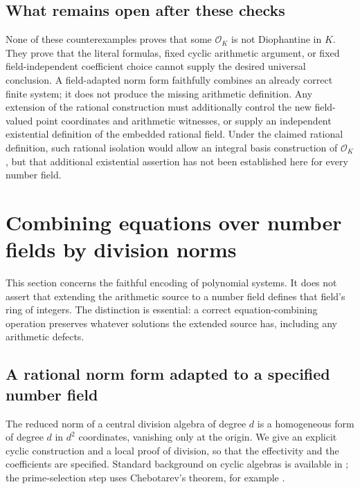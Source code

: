 \documentclass[11pt]{article}
\theoremstyle{definition}
\begin{document}
\subsection{What remains open after these checks}

None of these counterexamples proves that some
$\mathcal O_K$ is not Diophantine in $K$.  They prove that
the literal formulas, fixed cyclic arithmetic argument,
or fixed field-independent coefficient choice cannot supply
the desired universal conclusion.  A field-adapted norm form
faithfully combines an already correct finite system; it
does not produce the missing arithmetic definition.
Any extension of the rational construction must additionally
control the new field-valued point coordinates and arithmetic
witnesses, or supply an independent existential definition
of the embedded rational field.  Under the claimed rational
definition, such rational isolation would allow an integral
basis construction of $\mathcal O_K$, but that additional
existential assertion has not been established here for
every number field.


\section{Combining equations over number fields by division norms}
\label{sec:division-norm-compiler-phase3}

This section concerns the faithful encoding of polynomial systems.
It does not assert that extending the arithmetic source to a number
field defines that field's ring of integers.  The distinction is
essential: a correct equation-combining operation preserves whatever
solutions the extended source has, including any arithmetic defects.

\subsection{A rational norm form adapted to a specified number field}

The reduced norm of a central division algebra of degree $d$ is a
homogeneous form of degree $d$ in $d^2$ coordinates, vanishing only
at the origin.  We give an explicit cyclic construction and a local
proof of division, so that the effectivity and the coefficients are
specified.  Standard background on cyclic algebras is available in
\cite[Chapter IV]{MilneCFT2020}; the prime-selection step uses
Chebotarev's theorem, for example \cite[Section 2.4]{KedlayaCFT}.
\end{document}
